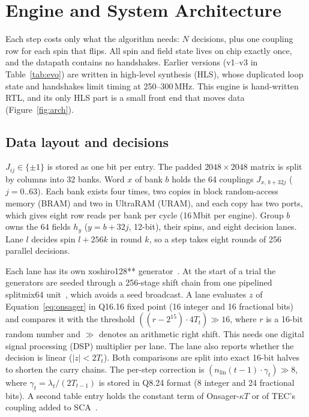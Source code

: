 \section{Engine and System Architecture}\label{sec:arch}

Each step costs only what the algorithm needs: $N$ decisions, plus one coupling row for each spin that flips. All spin and field state lives on chip exactly once, and the datapath contains no handshakes. Earlier versions (v1--v3 in Table~\ref{tab:evo}) are written in high-level synthesis (HLS), whose duplicated loop state and handshakes limit timing at 250--300\,MHz. This engine is hand-written RTL, and its only HLS part is a small front end that moves data (Figure~\ref{fig:arch}).



\subsection{Data layout and decisions}\label{subsec:layout}
$J_{ij}\in\{\pm1\}$ is stored as one bit per entry. The padded $2048\times2048$ matrix is split by columns into 32 banks. Word $x$ of bank $b$ holds the 64 couplings $J_{x,\,b+32j}$ ($j=0..63$). Each bank exists four times, two copies in block random-access memory (BRAM) and two in UltraRAM (URAM), and each copy has two ports, which gives eight row reads per bank per cycle (16\,Mbit per engine). Group $b$ owns the 64 fields $h_y$ ($y=b+32j$, 12-bit), their spins, and eight decision lanes. Lane $l$ decides spin $l+256k$ in round $k$, so a step takes eight rounds of 256 parallel decisions.

Each lane has its own xoshiro128** generator~\cite{blackman2021scrambled}. At the start of a trial the generators are seeded through a 256-stage shift chain from one pipelined splitmix64 unit~\cite{steele2014splitmix}, which avoids a seed broadcast. A lane evaluates $z$ of Equation~\eqref{eq:onsager} in Q16.16 fixed point (16 integer and 16 fractional bits) and compares it with the threshold $((r-2^{15})\cdot4T_t)\gg16$, where $r$ is a 16-bit random number and $\gg$ denotes an arithmetic right shift. This needs one digital signal processing (DSP) multiplier per lane. The lane also reports whether the decision is linear ($|z|<2T_t$). Both comparisons are split into exact 16-bit halves to shorten the carry chains. The per-step correction is $(n_{\mathrm{lin}}(t{-}1)\cdot\gamma_t)\gg8$, where $\gamma_t=\lambda_t/(2T_{t-1})$ is stored in Q8.24 format (8 integer and 24 fractional bits). A second table entry holds the constant term of Onsager-$\kappa T$ or of TEC's coupling added to SCA~\cite{du2026tec}.

